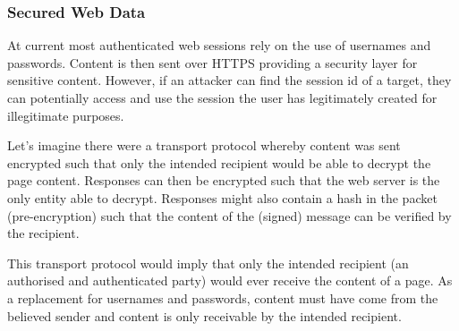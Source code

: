 \subsubsection{Secured Web Data}

At current most authenticated web sessions rely on the use of usernames and passwords. Content is then sent over HTTPS providing a security layer for sensitive content. However, if an attacker can find the session id of a target, they can potentially access and use the session the user has legitimately created for illegitimate purposes.

Let's imagine there were a transport protocol whereby content was sent encrypted such that only the intended recipient would be able to decrypt the page content. Responses can then be encrypted such that the web server is the only entity able to decrypt. Responses might also contain a hash in the packet (pre-encryption) such that the content of the (signed) message can be verified by the recipient.

This transport protocol would imply that only the intended recipient (an authorised and authenticated party) would ever receive the content of a page. As a replacement for usernames and passwords, content must have come from the believed sender and content is only receivable by the intended recipient. 
